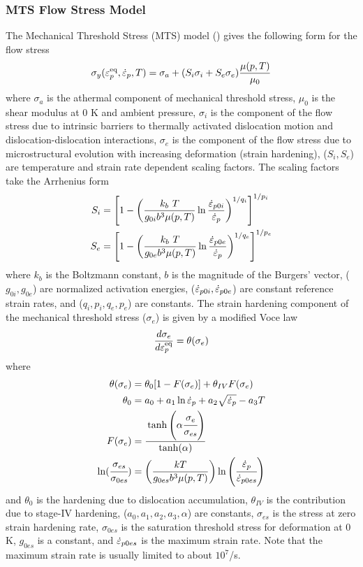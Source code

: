   \subsubsection{MTS Flow Stress Model}
  The Mechanical Threshold Stress (MTS) model
  (\cite{Follans1988,Goto2000a,Kocks2001})
  gives the following form for the flow stress
  \begin{equation}
    \sigma_y(\varepsilon_p^\text{eq},\dot{\varepsilon}_{p},T) = 
      \sigma_a + (S_i \sigma_i + S_e \sigma_e)\frac{\mu(p,T)}{\mu_0} 
  \end{equation}
  where $\sigma_a$ is the athermal component of mechanical threshold stress,
  $\mu_0$ is the shear modulus at 0 K and ambient pressure,
  $\sigma_i$ is the component of the flow stress due to intrinsic barriers
  to thermally activated dislocation motion and dislocation-dislocation
  interactions, $\sigma_e$ is the component of the flow stress due to
  microstructural evolution with increasing deformation (strain hardening),
  ($S_i, S_e$) are temperature and strain rate dependent scaling factors.  The
  scaling factors take the Arrhenius form
  \begin{align}
    S_i & = \left[1 - \left(\frac{k_b~T}{g_{0i}b^3\mu(p,T)}
    \ln\frac{\dot{\varepsilon}_{p0i}}{\dot{\varepsilon}_{p}}\right)^{1/q_i}
    \right]^{1/p_i} \\
    S_e & = \left[1 - \left(\frac{k_b~T}{g_{0e}b^3\mu(p,T)}
    \ln\frac{\dot{\varepsilon}_{p0e}}{\dot{\varepsilon}_{p}}\right)^{1/q_e}
    \right]^{1/p_e}
  \end{align}
  where $k_b$ is the Boltzmann constant, $b$ is the magnitude of the Burgers'
  vector, ($g_{0i}, g_{0e}$) are normalized activation energies,
  ($\dot{\varepsilon}_{p0i}, \dot{\varepsilon}_{p0e}$) are constant reference strain rates, and
  ($q_i, p_i, q_e, p_e$) are constants.  The strain hardening component
  of the mechanical threshold stress ($\sigma_e$) is given by a
  modified Voce law
  \begin{equation}\label{eq:MTSsige}
    \frac{d\sigma_e}{d\varepsilon_p^\text{eq}} = \theta(\sigma_e)
  \end{equation}
  where
  \begin{align}
    \theta(\sigma_e) & = 
       \theta_0 [ 1 - F(\sigma_e)] + \theta_{IV} F(\sigma_e) \\
    \theta_0 & = a_0 + a_1 \ln \dot{\varepsilon}_{p} + a_2 \sqrt{\dot{\varepsilon}_{p}} - a_3 T \\
    F(\sigma_e) & = 
      \cfrac{\tanh\left(\alpha \cfrac{\sigma_e}{\sigma_{es}}\right)}
      {\tanh(\alpha)}\\
    \ln(\cfrac{\sigma_{es}}{\sigma_{0es}}) & =
    \left(\frac{kT}{g_{0es} b^3 \mu(p,T)}\right)
    \ln\left(\cfrac{\dot{\varepsilon}_{p}}{\dot{\varepsilon}_{p0es}}\right)
  \end{align}
  and $\theta_0$ is the hardening due to dislocation accumulation,
  $\theta_{IV}$ is the contribution due to stage-IV hardening,
  ($a_0, a_1, a_2, a_3, \alpha$) are constants,
  $\sigma_{es}$ is the stress at zero strain hardening rate,
  $\sigma_{0es}$ is the saturation threshold stress for deformation at 0 K,
  $g_{0es}$ is a constant, and $\dot{\varepsilon}_{p0es}$ is the maximum strain rate.  Note
  that the maximum strain rate is usually limited to about $10^7$/s.

